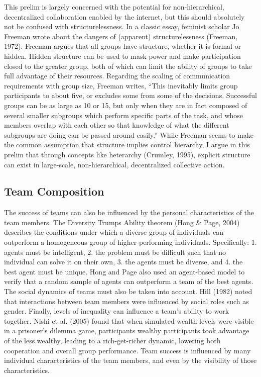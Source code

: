 This prelim is largely concerned with the potential for non-hierarchical, decentralized collaboration enabled by the internet, but this should absolutely not be confused with structurelessness. In a classic essay, feminist scholar Jo Freeman wrote about the dangers of (apparent) structurelessness (Freeman, 1972). Freeman argues that all groups have structure, whether it is formal or hidden. Hidden structure can be used to mask power and make participation closed to the greater group, both of which can limit the ability of groups to take full advantage of their resources. Regarding the scaling of communication requirements with group size, Freeman writes, ``This inevitably limits group participants to about five, or excludes some from some of the decisions. Successful groups can be as large as 10 or 15, but only when they are in fact composed of several smaller subgroups which perform specific parts of the task, and whose members overlap with each other so that knowledge of what the different subgroups are doing can be passed around easily.'' While Freeman seems to make the common assumption that structure implies control hierarchy, I argue in this prelim that through concepts like heterarchy (Crumley, 1995), explicit structure can exist in large-scale, non-hierarchical, decentralized collective action.

\subsection{Team Composition}
The success of teams can also be influenced by the personal characteristics of the team members. The Diversity Trumps Ability theorem (Hong \& Page, 2004) describes the conditions under which a diverse group of individuals can outperform a homogeneous group of higher-performing individuals. Specifically: 1. agents must be intelligent, 2. the problem must be difficult such that no individual can solve it on their own, 3. the agents must be diverse, and 4. the best agent must be unique. Hong and Page also used an agent-based model to verify that a random sample of agents can outperform a team of the best agents. The social dynamics of teams must also be taken into account. Hill (1982) noted that interactions between team members were influenced by social roles such as gender. Finally, levels of inequality can influence a team's ability to work together. Nishi et al. (2005) found that when simulated wealth levels were visible in a prisoner's dilemma game, participants wealthy participants took advantage of the less wealthy, leading to a rich-get-richer dynamic, lowering both cooperation and overall group performance. Team success is influenced by many individual characteristics of the team members, and even by the visibility of those characteristics.


